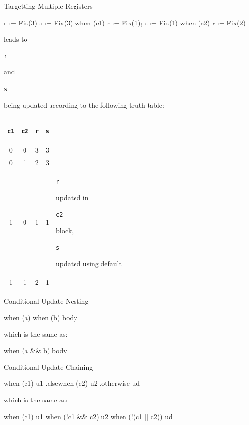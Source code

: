 \documentclass[xcolor=pdflatex,dvipsnames,table]{beamer}
\newcommand{\code}[1]{\begin{footnotesize}{\tt #1}\end{footnotesize}}
\begin{document}
\begin{frame}[fragile]{Targetting Multiple Registers}

\begin{scala}
r := Fix(3) 
s := Fix(3)
when (c1) { r := Fix(1); s := Fix(1) }
when (c2) { r := Fix(2) }
\end{scala}

leads to \code{r} and \code{s} being updated according to the
following truth table:

{\footnotesize
\begin{center}
\begin{tabular}{|c|c|c|c|l|}
\hline
\code{c1} & \code{c2}  & \code{r} & \code{s} & \\
\hline 
0 &  0 & 3 & 3 & \\
0 &  1 & 2 & 3 & \\ 
1 &  0 & 1 & 1 & \code{r} updated in \code{c2} block, \code{s} updated using default \\
1 &  1 & 2 & 1 & \\
\hline
\end{tabular}
\end{center}
}


\end{frame}

\begin{frame}[fragile]{Conditional Update Nesting}

\begin{scala}
when (a) { when (b) { body } }
\end{scala}

which is the same as:

\begin{scala}
when (a && b) { body }
\end{scala}

\end{frame}

\begin{frame}[fragile]{Conditional Update Chaining}

\begin{scala}
when (c1) { u1 }
.elsewhen (c2) { u2 }
.otherwise { ud }
\end{scala}

which is the same as:

\begin{scala}
when (c1) { u1 }
when (!c1 && c2) { u2 }
when (!(c1 || c2)) { ud }
\end{scala}

\end{frame}
\end{document}
